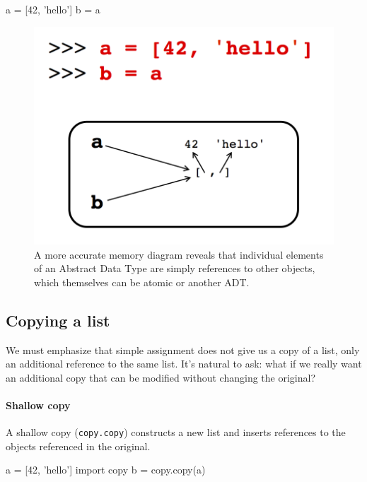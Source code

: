 \documentclass[12pt,letterpaper,twoside]{article}
\begin{document}
\begin{enumerate}
\vspace{-3ex}
\begin{python}
a = [42, 'hello']
b = a
\end{python}
\vspace{-2ex}
\begin{figure}[h]
\centering
\includegraphics[scale=0.35]{fig/list-ref.png}
\caption{\small A more accurate memory diagram reveals that individual elements of an Abstract Data Type are simply
references to other objects, which themselves can be atomic or another ADT.}
\end{figure}

\vspace{-3ex}
\subsection{Copying a list}
We must emphasize that simple assignment does not give us a copy of a list, only an
additional reference to the same list. It's natural to ask: 
what if we really want an additional copy that can be modified without
changing the original?

\paragraph{Shallow copy}
A shallow copy (\texttt{copy.copy}) constructs a new list and inserts
references to the objects referenced in the original.

\begin{python}
a = [42, 'hello']
import copy
b = copy.copy(a)
\end{python}


\end{enumerate}
\end{document}
